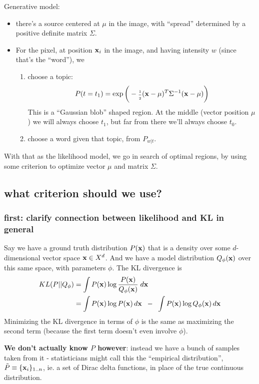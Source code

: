 \documentclass[11pt]{article}
\begin{document}
Generative model: 
\begin{itemize}
\item there's a source centered at $\mu$ in the image, with ``spread'' determined by a positive definite matrix $\Sigma$.

\item For the \ith pixel, at position $\mathbf{x}_i$ in the
image, and having intensity $w$ (since that's the ``word''), we 
\begin{enumerate}
\item choose a topic:
\[ P(t=t_1) = \exp \bigg( -\text{\tiny$\frac{1}{2}$} (\mathbf{x}-\mu)^T \Sigma^{-1} (\mathbf{x} - \mu) \bigg)
\]
This is a ``Gaussian blob'' shaped region. At the middle (vector position $\mu$) we will always choose $t_1$, but far from there we'll always choose $t_0$.
\item choose a word given that topic, from $P_{w|t}$.
\end{enumerate}
\end{itemize}

With that as the likelihood model, we go in search of optimal regions, by using some criterion to optimize vector $\mu$ and matrix $\Sigma$.

\subsection{what criterion should we use?}

\subsubsection{first: clarify connection between likelihood and KL in general}
Say we have a ground truth distribution $P(\mathbf{x})$ that is a density
over some $d$-dimensional vector space $\mathbf{x} \in X^d$. And we have a
model distribution $Q_\phi(\mathbf{x})$ over this same space, with parameters
$\phi$.  The KL divergence is
\begin{align}
KL(P || Q_\phi) &= \int P(\mathbf{x}) \log \frac{P(\mathbf{x})}{Q_\phi(\mathbf{x})}  \; d\mathbf{x}\\
&= \int P(\mathbf{x}) \log P(\mathbf{x}) \, d\mathbf{x} \;\; - \;\; \int P(\mathbf{x}) \log Q_\phi(\mathbf{x}) \, d\mathbf{x}
\end{align}
Minimizing the KL divergence in terms of $\phi$ is the same as
maximizing the second term (because the first term doesn't even
involve $\phi$).  

{\bf We don't actually know $P$ however}: instead we have
a bunch of samples taken from it - statisticians might call this the
``empirical distribution'', $\tilde{P} \equiv \{\mathbf{x}_i\}_{1..n} $, ie. a
set of Dirac delta functions, in place of the true continuous
distribution.
\end{document}

